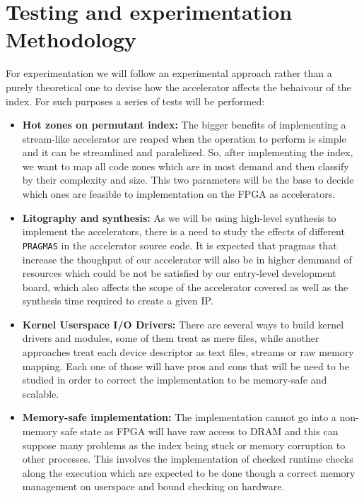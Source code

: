 \section{Testing and experimentation Methodology}
For experimentation we will follow an experimental approach rather than a purely theoretical one \cite{citation_required} to devise how the 
accelerator affects the behaivour of the index. For such purposes a series of tests will be performed:

\begin{itemize}
    \item {\textbf{Hot zones on permutant index:} The bigger benefits of implementing a stream-like accelerator are reaped when the operation
    to perform is simple and it can be streamlined and paralelized. So, after implementing the index, we want to map all code zones which are in most 
    demand and then classify by their complexity and size. This two parameters will be the base to decide which ones are feasible to implementation
    on the FPGA as accelerators.}
    \item {\textbf{Litography and synthesis:} As we will be using high-level synthesis to implement the accelerators, there is a need to study the 
    effects of different \texttt{PRAGMAS} in the accelerator source code. It is expected that pragmas that increase the thoughput of our 
    accelerator will also be in higher demmand of resources which could be not be satisfied by our entry-level development board, which also affects
    the scope of the accelerator covered as well as the synthesis time required to create a given IP.}
    \item {\textbf{Kernel Userspace I/O Drivers:} There are several ways to build kernel drivers and modules, some of them treat as mere files, while
    another approaches treat each device descriptor as text files, streams or raw memory mapping. Each one of those will have pros and cons that
    will be need to be studied in order to correct the implementation to be memory-safe and scalable.}
    \item {\textbf{Memory-safe implementation:} The implementation cannot go into a non-memory safe state as FPGA will have raw access to DRAM and this 
    can suppose many problems as the index being stuck or memory corruption to other processes. This involves the implementation of checked runtime checks
    along the execution which are expected to be done though a correct memory management on userspace and bound checking on hardware.}
\end{itemize}
